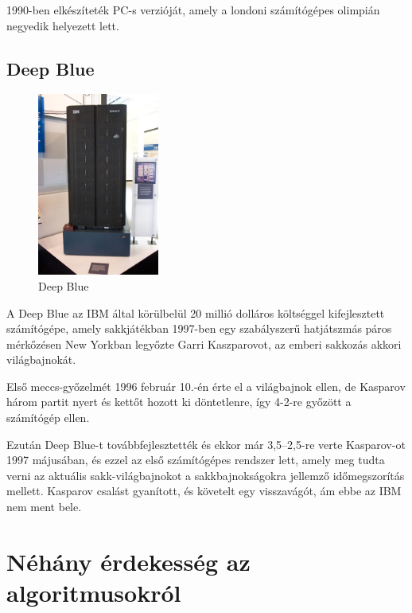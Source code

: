 \documentclass[twoside, a4paper, 12pt]{book}
\begin{document}
1990-ben elkészíteték PC-s verzióját, amely a londoni számítógépes olimpián negyedik helyezett lett.\cite{KaissaEn}

\section{Deep Blue}
\begin{figure}
	\caption{Deep Blue}
	\label{fig:deepblue}
	\includegraphics[width=4.0cm]{img/deepblue.jpg}
\end{figure}
A Deep Blue az IBM által körülbelül 20 millió dolláros költséggel kifejlesztett számítógépe, amely sakkjátékban 1997-ben egy szabályszerű hatjátszmás páros mérkőzésen New Yorkban legyőzte Garri Kaszparovot, az emberi sakkozás akkori világbajnokát.

Első meccs-győzelmét 1996 február 10.-én érte el a világbajnok ellen, de Kasparov három partit nyert és kettőt hozott ki döntetlenre, így 4-2-re győzött a számítógép ellen.

Ezután Deep Blue-t továbbfejlesztették és ekkor már 3,5–2,5-re verte Kasparov-ot 1997 májusában, és ezzel az első számítógépes rendszer lett, amely meg tudta verni az aktuális sakk-világbajnokot a sakkbajnokságokra jellemző időmegszorítás mellett. Kasparov csalást gyanított, és követelt egy visszavágót, ám ebbe az IBM nem ment bele. \cite{DeepBlueHu}\cite{DeepBlueEn}

\chapter{Néhány érdekesség az algoritmusokról}
\end{document}
